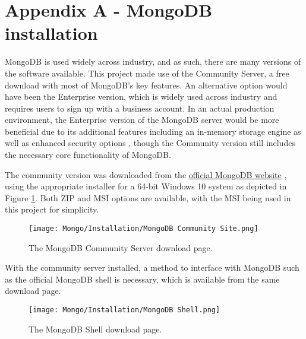 \begingroup
\renewcommand\thechapter{A}
\titleformat{\chapter}[display]
{\normalfont\huge\bfseries}{}{20pt}{\Huge}
\setcounter{section}{0}
\setcounter{figure}{0} 

\chapter*{Appendix A - MongoDB installation}

MongoDB is used widely across industry, and as such, there are many versions of the software available. 
This project made use of the Community Server, a free download with most of MongoDB's key features. An alternative 
option would have been the Enterprise version, which is widely used across industry and requires users to sign 
up with a business account. In an actual production environment, the Enterprise version of the MongoDB server 
would be more beneficial due to its additional features including an in-memory storage engine as well as enhanced 
security options \autocite{mongodb_mongodb_nodate}, though the Community version still includes the necessary 
core functionality of MongoDB.

\para The community version was downloaded from the \href{https://www.mongodb.com/try/download/community}{official MongoDB website} \autocite{mongodb_try_nodate},
using the appropriate installer for a 64-bit Windows 10 system as depicted in Figure \ref{fig:MongoDownload}. Both ZIP and MSI options
are available, with the MSI being used in this project for simplicity.

\begin{figure}[H]
    \centering
    \texttt{[image: Mongo/Installation/MongoDB Community Site.png]}
    \caption{The MongoDB Community Server download page.\label{fig:MongoDownload}}
\end{figure}

\noindent With the community server installed, a method to interface with MongoDB such as the official 
MongoDB shell is necessary, which is available from the same download page.

\begin{figure}[H]
    \centering
    \texttt{[image: Mongo/Installation/MongoDB Shell.png]}
    \caption{The MongoDB Shell download page.\label{fig:MongoShellDownload}}
\end{figure}


